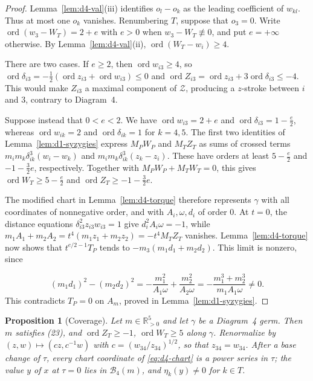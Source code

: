 \documentclass[Threeside,11pt]{article}
\newtheorem{proposition}[theorem]{Proposition}
\theoremstyle{definition}
\theoremstyle{remark}
\numberwithin{equation}{section}
\theoremstyle{remark}
\newcommand{\Rp}{\mathbb{R}_{>0}}
\newcommand{\ord}{\operatorname{ord}}
\begin{document}
\begin{proof}
{Lemma~\ref{lem:d4-val}(iii) identifies $o_l-o_k$ as the leading coefficient
of $w_{kl}$. Thus at most one}
{$o_k$ vanishes.  Renumbering $T$, suppose that $o_3=0$.  Write
$\ord(w_3-W_T)=2+e$ with $e>0$ when $w_3-W_T\not\equiv0$, and put $e=+\infty$ otherwise.}
By Lemma~\ref{lem:d4-val}(ii), $\ord(W_T-w_i)\ge4$.

{There are two cases. If $e\ge2$, then $\ord w_{i3}\ge4$, so
$\ord\delta_{i3}=-\frac12(\ord z_{i3}+\ord w_{i3})\le0$ and
$\ord Z_{i3}=\ord z_{i3}+3\ord\delta_{i3}\le-4$. This would make $Z_{i3}$ a maximal component
of $\mathcal Z$, producing a $z$-stroke between $i$ and $3$, contrary to Diagram~4.

Suppose instead that $0<e<2$. We have $\ord w_{i3}=2+e$ and $\ord\delta_{i3}=1-\frac e2$,
whereas $\ord w_{ik}=2$ and $\ord\delta_{ik}=1$ for $k=4,5$.
The first two identities of Lemma~\ref{lem:d1-syzygies} express $M_PW_P$ and $M_TZ_T$
as sums of crossed terms $m_im_k\delta_{ik}^3(w_i-w_k)$ and $m_im_k\delta_{ik}^3(z_k-z_i)$.
These have orders at least $5-\frac e2$ and $-1-\frac32e$, respectively.
Together with $M_PW_P+M_TW_T=0$, this gives $\ord W_T\ge5-\frac e2$ and
$\ord Z_T\ge-1-\frac32e$.

The modified chart in Lemma~\ref{lem:d4-torque} therefore represents $\gamma$ with all coordinates
of nonnegative order, and with $A_i,\omega,d_i$ of order $0$.
At $t=0$, the distance equations $\delta_{i3}^2z_{i3}w_{i3}=1$ give $d_i^2A_i\omega=-1$,
while $m_1A_1+m_2A_2=t^4(m_1z_1+m_2z_2)=-t^4M_TZ_T$ vanishes.
Lemma~\ref{lem:d4-torque} now shows that $t^{e/2-1}T_P$ tends to $-m_3(m_1d_1+m_2d_2)$.
This limit is nonzero, since}
\[
  (m_1d_1)^2-(m_2d_2)^2=-\frac{m_1^2}{A_1\omega}+\frac{m_2^2}{A_2\omega}
  =-\frac{m_1^3+m_2^3}{m_1A_1\omega}\ne0 .
\]
{This contradicts $T_P=0$ on $A_m$, proved in Lemma~\ref{lem:d1-syzygies}.}
\end{proof}

\begin{proposition}[Coverage]\label{prop:d4-cover}
Let $m\in\Rp^5$ and let $\gamma$ be a Diagram~4 germ.  Then $m$ satisfies (23), and
$\ord Z_T\ge-1$, $\ord W_T\ge5$ along $\gamma$.  Renormalize by $(z,w)\mapsto(cz,c^{-1}w)$ with
$c=(w_{34}/z_{34})^{1/2}$, so that $z_{34}=w_{34}$.  After a base change of $\tau$, every chart
coordinate of \eqref{eq:d4-chart} is a power series in $\tau$; the value $y$ of $x$ at $\tau=0$
lies in $\mathcal B_4(m)$, and $\eta_k(y)\ne0$ for $k\in T$.
\end{proposition}
\end{document}

